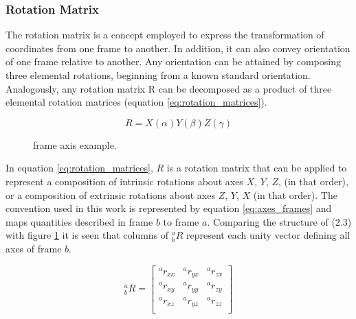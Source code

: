 \subsubsection{Rotation Matrix}

The rotation matrix is a concept employed to express the transformation of coordinates from one frame to another. In addition, it can also convey orientation of one frame relative to another. Any orientation can be attained by composing three elemental rotations, beginning from a known standard orientation. Analogously, any rotation matrix R can be decomposed as a product of three elemental rotation matrices (equation \ref{eq:rotation_matrices}).

\begin{equation}
    R = X(\alpha)Y(\beta)Z(\gamma)
    \label{eq:rotation_matrices}
\end{equation}

\begin{figure}[!h]
    \centering
    \resizebox{0.44\linewidth}{!}{}
    \resizebox{0.54\linewidth}{!}{}
    \caption{frame axis example.}
    \label{fig:axes_frames}
\end{figure}

In equation \ref{eq:rotation_matrices}, $R$ is a rotation matrix that can be applied to represent a composition of intrinsic rotations about axes $X$, $Y$, $Z$, (in that order), or a composition of extrinsic rotations about axes $Z$, $Y$, $X$ (in that order). The convention used in this work is represented by equation \ref{eq:axes_frames} and maps quantities described in frame $b$ to frame $a$. Comparing the structure of (2.3) with figure \ref{fig:axes_frames} it is seen that columns of $^a_bR$ represent each unity vector defining all axes of frame $b$.

\begin{equation}
    \textrm{$_{b}^{a}R$}
    =
    \begin{bmatrix}
        \textrm{$^{a}r_{xx}$} & \textrm{$^{a}r_{yx}$} & \textrm{$^{a}r_{zx}$} \\
        \textrm{$^{a}r_{xy}$} & \textrm{$^{a}r_{yy}$} & \textrm{$^{a}r_{zy}$} \\
        \textrm{$^{a}r_{xz}$} & \textrm{$^{a}r_{yz}$} & \textrm{$^{a}r_{zz}$} \\
    \end{bmatrix}
    \label{eq:axes_frames}
\end{equation}

